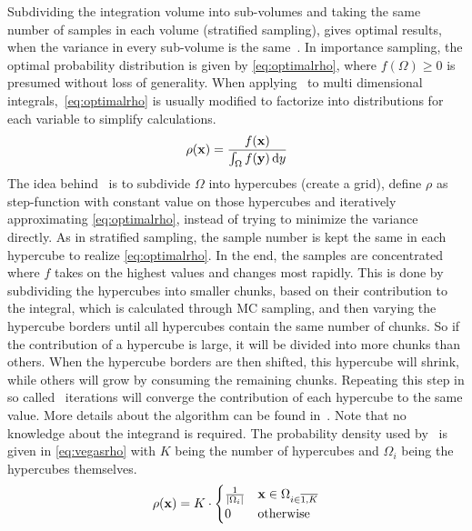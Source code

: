 Subdividing the integration volume into sub-volumes and taking the same
number of samples in each volume (stratified sampling), gives optimal
results, when the variance in every sub-volume is the
same~\cite{Lepage:19781an}. In importance sampling, the optimal
probability distribution is given by \cref{eq:optimalrho}, where
\(f(\Omega) \geq 0\) is presumed without loss of generality. When
applying \vegas\ to multi dimensional integrals,~\cref{eq:optimalrho}
is usually modified to factorize into distributions for each variable
to simplify calculations.
%
\begin{equation}
  \label{eq:optimalrho}
  \rho(\vb{x}) = \frac{f(\vb{x})}{\int_\Omega f(\vb{y})\dd{y}}
\end{equation}
%
The idea behind \vegas\ is to subdivide \(\Omega\) into hypercubes
(create a grid), define \(\rho\) as step-function with constant value
on those hypercubes and iteratively approximating
\cref{eq:optimalrho}, instead of trying to minimize the variance
directly. As in stratified sampling, the sample number is kept the
same in each hypercube to realize \cref{eq:optimalrho}. In the end,
the samples are concentrated where \(f\) takes on the highest values
and changes most rapidly. This is done by subdividing the hypercubes
into smaller chunks, based on their contribution to the integral,
which is calculated through MC sampling, and then varying the
hypercube borders until all hypercubes contain the same number of
chunks.  So if the contribution of a hypercube is large, it will be
divided into more chunks than others. When the hypercube borders are
then shifted, this hypercube will shrink, while others will grow by
consuming the remaining chunks.  Repeating this step in so called
\vegas\ iterations will converge the contribution of each hypercube to
the same value. More details about the algorithm can be found
in~\cite{Lepage:19781an}.  Note that no knowledge about the integrand
is required. The probability density used by \vegas\ is given in
\cref{eq:vegasrho} with \(K\) being the number of hypercubes and
\(\Omega_i\) being the hypercubes themselves.
%
\begin{equation}
  \label{eq:vegasrho}
  \rho(\vb{x}) = K\cdot
  \begin{cases}
    \frac{1}{\abs{\Omega_i}} & \vb{x}\in\Omega_{i\in\overline{1,K}} \\
    0 & \text{otherwise}
  \end{cases}
\end{equation}

